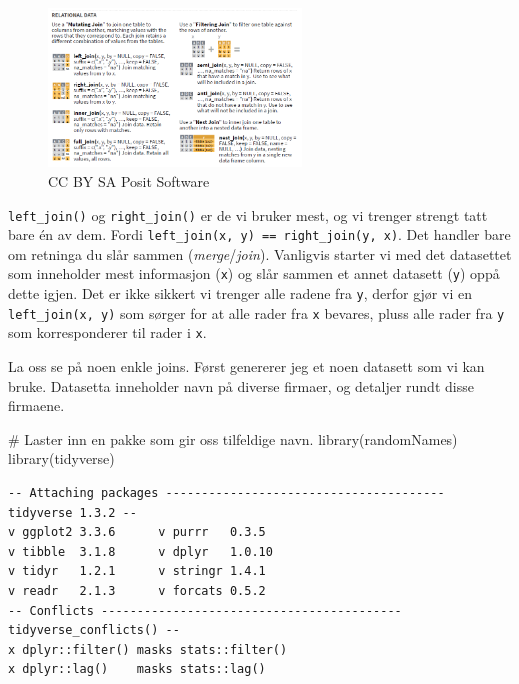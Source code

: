 \documentclass[
  letterpaper,
  DIV=11,
  numbers=noendperiod]{scrreprt}
\newenvironment{Shaded}{\begin{snugshade}}{\end{snugshade}}
\newcommand{\CommentTok}[1]{\textcolor[rgb]{0.37,0.37,0.37}{#1}}
\newcommand{\FunctionTok}[1]{\textcolor[rgb]{0.28,0.35,0.67}{#1}}
\newcommand{\NormalTok}[1]{\textcolor[rgb]{0.00,0.23,0.31}{#1}}
\begin{document}
\begin{figure}

{\centering \includegraphics[width=0.6\textwidth,height=\textheight]{./img/joins.PNG}

}

\caption{CC BY SA Posit Software}

\end{figure}

\texttt{left\_join()} og \texttt{right\_join()} er de vi bruker mest, og
vi trenger strengt tatt bare én av dem. Fordi
\texttt{left\_join(x,\ y)\ ==\ right\_join(y,\ x)}. Det handler bare om
retninga du slår sammen (\emph{merge}/\emph{join}). Vanligvis starter vi
med det datasettet som inneholder mest informasjon (\texttt{x}) og slår
sammen et annet datasett (\texttt{y}) oppå dette igjen. Det er ikke
sikkert vi trenger alle radene fra \texttt{y}, derfor gjør vi en
\texttt{left\_join(x,\ y)} som sørger for at alle rader fra \texttt{x}
bevares, pluss alle rader fra \texttt{y} som korresponderer til rader i
\texttt{x}.

La oss se på noen enkle joins. Først genererer jeg et noen datasett som
vi kan bruke. Datasetta inneholder navn på diverse firmaer, og detaljer
rundt disse firmaene.

\begin{Shaded}
\begin{Highlighting}[]
\CommentTok{\# Laster inn en pakke som gir oss tilfeldige navn.}
\FunctionTok{library}\NormalTok{(randomNames)}
\FunctionTok{library}\NormalTok{(tidyverse)}
\end{Highlighting}
\end{Shaded}

\begin{verbatim}
-- Attaching packages --------------------------------------- tidyverse 1.3.2 --
v ggplot2 3.3.6      v purrr   0.3.5 
v tibble  3.1.8      v dplyr   1.0.10
v tidyr   1.2.1      v stringr 1.4.1 
v readr   2.1.3      v forcats 0.5.2 
-- Conflicts ------------------------------------------ tidyverse_conflicts() --
x dplyr::filter() masks stats::filter()
x dplyr::lag()    masks stats::lag()
\end{verbatim}
\end{document}
